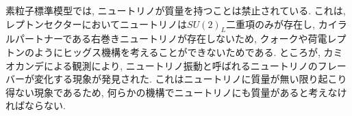%
%
素粒子標準模型では, ニュートリノが質量を持つことは禁止されている.
これは, レプトンセクターにおいてニュートリノは$SU(2)_L$二重項のみが存在し, カイラルパートナーである右巻きニュートリノが存在しないため, クォークや荷電レプトンのようにヒッグス機構を考えることができないためである.
ところが, カミオカンデによる観測により, ニュートリノ振動と呼ばれるニュートリノのフレーバーが変化する現象が発見された\cite{collaborationDirectEvidenceNeutrino2002,collaborationEvidenceOscillationAtmospheric1998,collaborationFirstResultsKamLAND2003}.
これはニュートリノに質量が無い限り起こり得ない現象である\cite{pontecorvoNeutrinoExperimentsProblem1967,makiRemarksUnifiedModel1962}ため, 何らかの機構でニュートリノにも質量があると考えなければならない.

